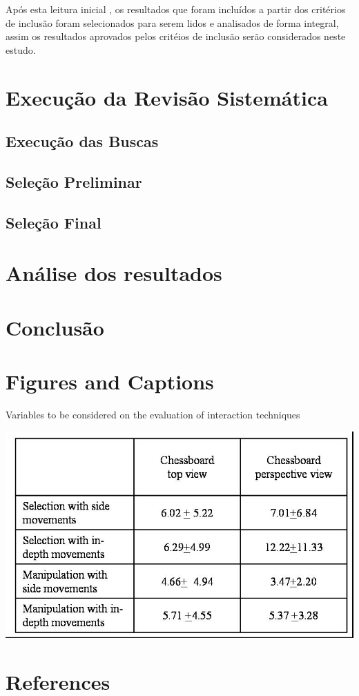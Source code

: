 \documentclass[12pt]{article}
\begin{document}
Após  esta leitura inicial ,  os  resultados que foram incluídos a partir dos critérios de inclusão foram  selecionados  para  serem  lidos e  analisados de forma integral, assim os resultados aprovados pelos critéios de inclusão serão considerados neste estudo.

\section{Execução da Revisão Sistemática} \label{sec4}

\subsection{Execução das Buscas} \label{sec4:subsec1}

\subsection{Seleção Preliminar} \label{sec4:subsec2}

\subsection{Seleção Final} \label{sec4:subsec3}

\section{Análise dos resultados} \label{sec5}

\section{Conclusão} \label{sec6}

\section{Figures and Captions}\label{sec:figs}

\begin{table}[ht]
\centering
\caption{Variables to be considered on the evaluation of interaction
  techniques}
\label{tab:exTable1}
\includegraphics[width=.7\textwidth]{table.jpg}
\end{table}

\section{References}


\end{document}
